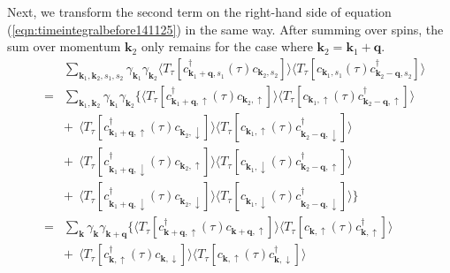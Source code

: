 \documentclass[a4j]{jsarticle}
\begin{document}
Next, we transform the second term on the right-hand side of equation (\ref{eqn:timeintegralbefore141125}) in the same way.
After summing over spins, the sum over momentum $\bm{k}_{2}$ only remains for the case where $\bm{k}_{2} = \bm{k}_{1} + \bm{q}$.
%
%
%
%
\begin{eqnarray}
	&&
	\sum_{\bm{k}_{1} , \bm{k}_{2} , s_{1} ,s_{2} }
	\gamma_{\bm{k}_{1}}
	\gamma_{\bm{k}_{2}}
	\langle T_{\tau} [
			c_{ \bm{k}_{1}+\bm{q} , s_{1} }^{\dagger} (\tau)
			c_{ \bm{k}_{2} , s_{2} }
		] \rangle
	\langle T_{\tau} [
			c_{ \bm{k}_{1} , s_{1} } (\tau)
			c_{ \bm{k}_{2}-\bm{q} , s_{2} }^{\dagger}
		] \rangle
	\\ &=&
	\sum_{\bm{k}_{1} , \bm{k}_{2} }
	\gamma_{\bm{k}_{1}}
	\gamma_{\bm{k}_{2}}
	\Big\{
	\langle T_{\tau} [
			c_{ \bm{k}_{1}+\bm{q} , \uparrow }^{\dagger} (\tau)
			c_{ \bm{k}_{2} , \uparrow }
		] \rangle
	\langle T_{\tau} [
			c_{ \bm{k}_{1} , \uparrow } (\tau)
			c_{ \bm{k}_{2}-\bm{q} , \uparrow }^{\dagger}
		] \rangle
	\nonumber \\[2mm] && + \ \
	\langle T_{\tau} [
			c_{ \bm{k}_{1}+\bm{q} , \uparrow }^{\dagger} (\tau)
			c_{ \bm{k}_{2} , \downarrow }
		] \rangle
	\langle T_{\tau} [
			c_{ \bm{k}_{1} , \uparrow } (\tau)
			c_{ \bm{k}_{2}-\bm{q} , \downarrow }^{\dagger}
		] \rangle
	\nonumber \\[2mm] && + \ \
	\langle T_{\tau} [
			c_{ \bm{k}_{1}+\bm{q} , \downarrow }^{\dagger} (\tau)
			c_{ \bm{k}_{2} , \uparrow }
		] \rangle
	\langle T_{\tau} [
			c_{ \bm{k}_{1} , \downarrow } (\tau)
			c_{ \bm{k}_{2}-\bm{q} , \uparrow }^{\dagger}
		] \rangle
	\nonumber \\[2mm] && + \ \
	\langle T_{\tau} [
			c_{ \bm{k}_{1}+\bm{q} , \downarrow }^{\dagger} (\tau)
			c_{ \bm{k}_{2} , \downarrow }
		] \rangle
	\langle T_{\tau} [
			c_{ \bm{k}_{1} , \downarrow } (\tau)
			c_{ \bm{k}_{2}-\bm{q} , \downarrow }^{\dagger}
		] \rangle
	\Big\}
	\nonumber \\[3mm]
	&=&
	\sum_{ \bm{k} }
	\gamma_{\bm{k}}
	\gamma_{\bm{k}+\bm{q}}
	\Big\{
	\langle T_{\tau} [
			c_{ \bm{k}+\bm{q} , \uparrow }^{\dagger} (\tau)
			c_{ \bm{k}+\bm{q} , \uparrow }
		] \rangle
	\langle T_{\tau} [
			c_{ \bm{k} , \uparrow } (\tau)
			c_{ \bm{k} , \uparrow }^{\dagger}
		] \rangle
	\nonumber \\[2mm] && + \ \
	\langle T_{\tau} [
			c_{ \bm{k} , \uparrow }^{\dagger} (\tau)
			c_{ \bm{k} , \downarrow }
		] \rangle
	\langle T_{\tau} [
			c_{ \bm{k} , \uparrow } (\tau)
			c_{ \bm{k} , \downarrow }^{\dagger}
		] \rangle

\end{eqnarray}
\end{document}
